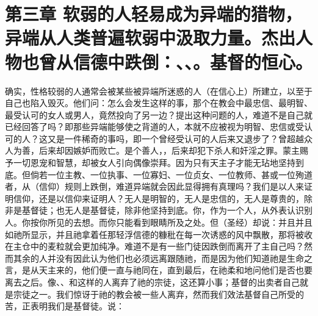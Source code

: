 
\section{第三章 软弱的人轻易成为异端的猎物，异端从人类普遍软弱中汲取力量。杰出人物也曾从信德中跌倒：、、。基督的恒心。}

确实，性格较弱的人通常会被某些被异端所迷惑的人（在信心上）所建立，以至于自己也陷入毁灭。他们问：怎么会发生这样的事，那个在教会中最忠信、最明智、最受认可的女人或男人，竟然投向了另一边？提出这种问题的人，难道不是自己就已经回答了吗？即那些异端能够使之背道的人，本就不应被视为明智、忠信或受认可的人？这又是一件稀奇的事吗，即一个曾经受认可的人后来又退步了？曾超越众人为善，后来却因嫉妒而败亡。是个善人，，后来却犯下杀人和奸淫之罪。蒙主赐予一切恩宠和智慧，却被女人引向偶像崇拜。因为只有天主子才能无玷地坚持到底。但倘若一位主教、一位执事、一位寡妇、一位贞女、一位教师、甚或一位殉道者，从（信仰）规则上跌倒，难道异端就会因此显得拥有真理吗？我们是以人来证明信仰，还是以信仰来证明人？无人是明智的，无人是忠信的，无人是尊贵的，除非是基督徒；也无人是基督徒，除非他坚持到底。你，作为一个人，从外表认识别人。你按你所见的去想。而你只能看到眼睛所及之处。但（圣经）却说：并且并且如祂所显示，并且祂拿着任那轻浮信德的糠秕在每一次诱惑的风中飘散，那将被收在主仓中的麦粒就会更加纯净。难道不是有一些门徒因跌倒而离开了主自己吗？然而其余的人并没有因此认为他们也必须远离跟随祂，而是因为他们知道祂是生命之言，是从天主来的，他们便一直与祂同在，直到最后，在祂柔和地问他们是否也要离去之后。像、、和这样的人离弃了祂的宗徒，这还算小事；基督的出卖者自己就是宗徒之一。我们惊讶于祂的教会被一些人离弃，然而我们效法基督自己所受的苦，正表明我们是基督徒。说：\par

